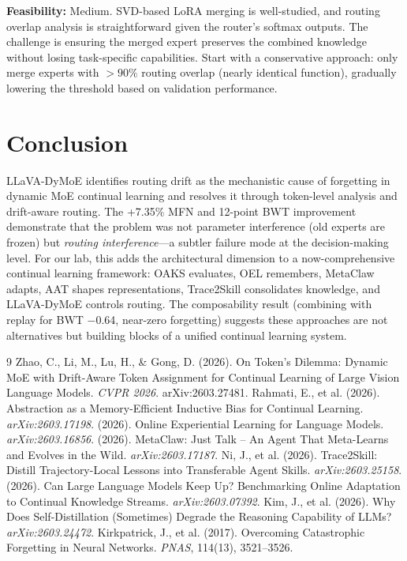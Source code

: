 \documentclass[11pt]{article}
\begin{document}
\textbf{Feasibility:} Medium. SVD-based LoRA merging is well-studied, and routing overlap analysis is straightforward given the router's softmax outputs. The challenge is ensuring the merged expert preserves the combined knowledge without losing task-specific capabilities. Start with a conservative approach: only merge experts with $>90\%$ routing overlap (nearly identical function), gradually lowering the threshold based on validation performance.

\section{Conclusion}

LLaVA-DyMoE identifies routing drift as the mechanistic cause of forgetting in dynamic MoE continual learning and resolves it through token-level analysis and drift-aware routing. The +7.35\% MFN and 12-point BWT improvement demonstrate that the problem was not parameter interference (old experts are frozen) but \textit{routing interference}---a subtler failure mode at the decision-making level. For our lab, this adds the architectural dimension to a now-comprehensive continual learning framework: OAKS evaluates, OEL remembers, MetaClaw adapts, AAT shapes representations, Trace2Skill consolidates knowledge, and LLaVA-DyMoE controls routing. The composability result (combining with replay for BWT $-$0.64, near-zero forgetting) suggests these approaches are not alternatives but building blocks of a unified continual learning system.

\begin{thebibliography}{9}
 Zhao, C., Li, M., Lu, H., \& Gong, D. (2026). On Token's Dilemma: Dynamic MoE with Drift-Aware Token Assignment for Continual Learning of Large Vision Language Models. \textit{CVPR 2026}. arXiv:2603.27481.
 Rahmati, E., et al. (2026). Abstraction as a Memory-Efficient Inductive Bias for Continual Learning. \textit{arXiv:2603.17198}.
 (2026). Online Experiential Learning for Language Models. \textit{arXiv:2603.16856}.
 (2026). MetaClaw: Just Talk -- An Agent That Meta-Learns and Evolves in the Wild. \textit{arXiv:2603.17187}.
 Ni, J., et al. (2026). Trace2Skill: Distill Trajectory-Local Lessons into Transferable Agent Skills. \textit{arXiv:2603.25158}.
 (2026). Can Large Language Models Keep Up? Benchmarking Online Adaptation to Continual Knowledge Streams. \textit{arXiv:2603.07392}.
 Kim, J., et al. (2026). Why Does Self-Distillation (Sometimes) Degrade the Reasoning Capability of LLMs? \textit{arXiv:2603.24472}.
 Kirkpatrick, J., et al. (2017). Overcoming Catastrophic Forgetting in Neural Networks. \textit{PNAS}, 114(13), 3521--3526.
\end{thebibliography}
\end{document}
